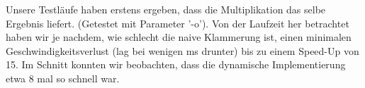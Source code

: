 \documentclass[11pt,a4paper,ngerman]{article}
\begin{document}
\begin{enumerate}[\bfseries (a)]
\begin{description}
Unsere Testläufe haben erstens ergeben, dass die Multiplikation das selbe Ergebnis liefert. (Getestet mit Parameter '-o'). Von der Laufzeit her betrachtet haben wir je nachdem, wie schlecht die naive Klammerung ist, einen minimalen Geschwindigkeitsverlust (lag bei wenigen ms drunter) bis zu einem Speed-Up von 15. Im Schnitt konnten wir beobachten, dass die dynamische Implementierung etwa 8 mal so schnell war.
\end{description}

\end{enumerate}

\label{LastPage}
\end{document}
